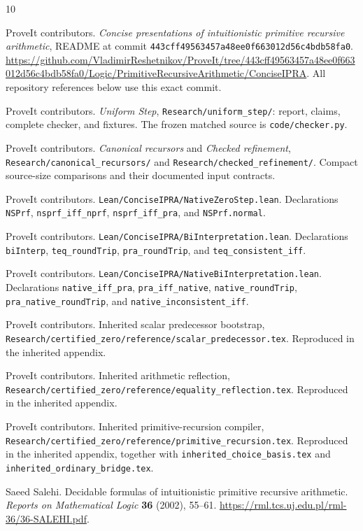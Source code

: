 \documentclass[11pt]{article}
\theoremstyle{definition}
\begin{document}
\clearpage
\begin{thebibliography}{10}
\raggedright
{}
ProveIt contributors. \emph{Concise presentations of intuitionistic primitive
recursive arithmetic}, README at commit
\texttt{443cff49563457a48ee0f663012d56c4bdb58fa0}.
\url{https://github.com/VladimirReshetnikov/ProveIt/tree/443cff49563457a48ee0f663012d56c4bdb58fa0/Logic/PrimitiveRecursiveArithmetic/ConciseIPRA}.
All repository references below use this exact commit.

ProveIt contributors. \emph{Uniform Step},
\nolinkurl{Research/uniform_step/}: report, claims, complete checker, and fixtures.
The frozen matched source is \nolinkurl{code/checker.py}.

ProveIt contributors. \emph{Canonical recursors} and \emph{Checked refinement},
\nolinkurl{Research/canonical_recursors/} and
\nolinkurl{Research/checked_refinement/}. Compact source-size comparisons and
their documented input contracts.

ProveIt contributors. \nolinkurl{Lean/ConciseIPRA/NativeZeroStep.lean}.
Declarations \texttt{NSPrf}, \texttt{nsprf\_iff\_nprf},
\texttt{nsprf\_iff\_pra}, and \texttt{NSPrf.normal}.

ProveIt contributors. \nolinkurl{Lean/ConciseIPRA/BiInterpretation.lean}.
Declarations \texttt{biInterp}, \texttt{teq\_roundTrip},
\texttt{pra\_roundTrip}, and \texttt{teq\_consistent\_iff}.

ProveIt contributors. \nolinkurl{Lean/ConciseIPRA/NativeBiInterpretation.lean}.
Declarations \texttt{native\_iff\_pra}, \texttt{pra\_iff\_native},
\texttt{native\_roundTrip}, \texttt{pra\_native\_roundTrip}, and
\texttt{native\_inconsistent\_iff}.

ProveIt contributors. Inherited scalar predecessor bootstrap,
\nolinkurl{Research/certified_zero/reference/scalar_predecessor.tex}.
Reproduced in the inherited appendix.

ProveIt contributors. Inherited arithmetic reflection,
\nolinkurl{Research/certified_zero/reference/equality_reflection.tex}.
Reproduced in the inherited appendix.

ProveIt contributors. Inherited primitive-recursion compiler,
\nolinkurl{Research/certified_zero/reference/primitive_recursion.tex}.
Reproduced in the inherited appendix, together with
\nolinkurl{inherited_choice_basis.tex} and
\nolinkurl{inherited_ordinary_bridge.tex}.

Saeed Salehi. Decidable formulas of intuitionistic primitive recursive
arithmetic. \emph{Reports on Mathematical Logic} \textbf{36} (2002), 55--61.
\url{https://rml.tcs.uj.edu.pl/rml-36/36-SALEHI.pdf}.
\end{thebibliography}
\end{document}
